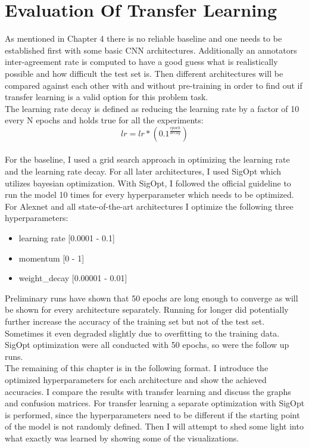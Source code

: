 \chapter{Evaluation Of Transfer Learning}

As mentioned in Chapter 4 there is no reliable baseline and one needs to be established first with some basic CNN architectures. Additionally an annotators inter-agreement rate is computed to have a good guess what is realistically possible and how difficult the test set is. Then different architectures will be compared against each other with and without pre-training in order to find out if transfer learning is a valid option for this problem task. \\

The learning rate decay is defined as reducing the learning rate by a factor of 10 every N epochs and holds true for all the experiments: \\

\[ lr = lr * (0.1^{\frac{epoch}{decay}}) \] \\

For the baseline, I used a grid search approach in optimizing the learning rate and the learning rate decay. For all later architectures, I used SigOpt which utilizes bayesian optimization. With SigOpt, I followed the official guideline to run the model 10 times for every hyperparameter which needs to be optimized. For Alexnet and all state-of-the-art architectures I optimize the following three hyperparameters: \\

\begin{itemize}
  \item learning rate [0.0001 - 0.1]
  \item momentum [0 - 1]
  \item weight\_decay [0.00001 - 0.01]
\end{itemize} 

\quad

Preliminary runs have shown that 50 epochs are long enough to converge as will be shown for every architecture separately. Running for longer did potentially further increase the accuracy of the training set but not of the test set. Sometimes it even degraded slightly due to overfitting to the training data. SigOpt optimization were all conducted with 50 epochs, so were the follow up runs.\\


The remaining of this chapter is in the following format. I introduce the optimized hyperparameters for each architecture and show the achieved accuracies. I compare the results with transfer learning and discuss the graphs and confusion matrices. For transfer learning a separate optimization with SigOpt is performed, since the hyperparameters need to be different if the starting point of the model is not randomly defined. Then I will attempt to shed some light into what exactly was learned by showing some of the visualizations.








